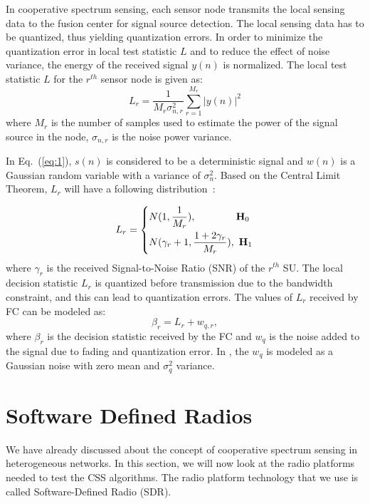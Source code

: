 In cooperative spectrum sensing, each sensor node transmits the local sensing data to the fusion center for signal source detection. The local sensing data has to be quantized, thus yielding quantization errors. In order to minimize the quantization error in local test statistic $L$ and to reduce the effect of noise variance, the energy of the received signal $y(n)$ is normalized\cite{arhtn13}. The local test statistic $L$ for the $r^{th}$ sensor node is given as:
\begin{equation}
	\label{eq:5}
	L_r = \dfrac{1}{M_r\sigma_{n,r}^2}\sum_{r=1}^{M_r}|y(n)|^2
\end{equation}
where $M_r$ is the number of samples used to estimate the power of the signal source in the node,  $\sigma_{n,r}$ is the noise power variance.

In Eq.~(\ref{eq:1}), $s(n)$ is considered to be a deterministic signal and $w(n)$ is a Gaussian random variable with a variance of $\sigma_n^2$. Based on the Central Limit Theorem, $L_r$ will have a following distribution~\cite{inphtn7}:

\begin{equation}
	\label{eq:6}
	L_r = 
	\left\{
	\begin{aligned}
		& N(1,\dfrac{1}{M_r}),~~~~~~~~~~~~\mathbf{H}_0 \\
		& N(\gamma_r+1,\dfrac{1+2\gamma_r}{M_r}),~\mathbf{H}_1		
	\end{aligned}
	\right.
\end{equation}
where $\gamma_r$ is the received Signal-to-Noise Ratio (SNR) of the $r^{th}$ SU. The local decision statistic $L_r$ is quantized before transmission due to the bandwidth constraint, and this can lead to quantization errors. The values of $L_r$ received by FC can be modeled as:
\begin{equation}
	\label{eq:7}
	 \beta_r = L_r + w_{q,r},
\end{equation}
where $\beta_r$ is the decision statistic received by the FC and $w_q$ is the noise added to the signal due to fading and quantization error. In \cite{arhtn14}, the $w_q$ is modeled as a Gaussian noise with zero mean and $\sigma_q^2$ variance.

\section{Software Defined Radios}
We have already discussed about the concept of cooperative spectrum sensing in heterogeneous networks. In this section, we will now look at the radio platforms needed to test the CSS algorithms. The radio platform technology that we use is called Software-Defined Radio (SDR).

